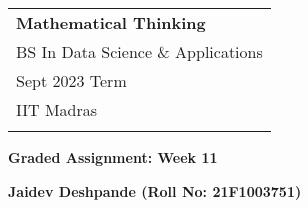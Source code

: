 \documentclass[a4paper,12pt]{article} %
\begin{document}
\thispagestyle{empty} %

\begin{tabular}{p{15.5cm}} %
{\large \bf Mathematical Thinking} \\
BS In Data Science \& Applications  \\ Sept 2023 Term  \\ IIT Madras\\
\hline %
\\
\end{tabular} %

\vspace*{0.3cm} %

\begin{center} %
	{\Large \bf Graded Assignment: Week 11} %
	\vspace{2mm}

	{\bf Jaidev Deshpande (Roll No: 21F1003751)} %

\end{center}

\vspace{0.4cm}
\end{document}
